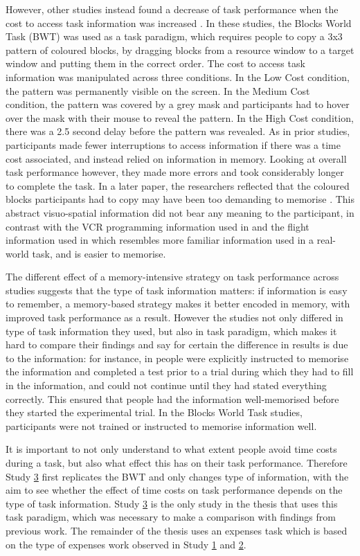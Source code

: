 However, other studies instead found a decrease of task performance when the cost to access task information was increased \citep{Gray2006, Morgan2009}. In these studies, the Blocks World Task (BWT) was used as a task paradigm, which requires people to copy a 3x3 pattern of coloured blocks, by dragging blocks from a resource window to a target window and putting them in the correct order. The cost to access task information was manipulated across three conditions. In the Low Cost condition, the pattern was permanently visible on the screen. In the Medium Cost condition, the pattern was covered by a grey mask and participants had to hover over the mask with their mouse to reveal the pattern. In the High Cost condition, there was a 2.5 second delay before the pattern was revealed. As in prior studies, participants made fewer interruptions to access information if there was a time cost associated, and instead relied on information in memory. Looking at overall task performance however, they made more errors and took considerably longer to complete the task. In a later paper, the researchers reflected that the coloured blocks participants had to copy may have been too demanding to memorise \citep{Waldron2011}. This abstract visuo-spatial information did not bear any meaning to the participant, in contrast with the VCR programming information used in \citet{Gray2004} and the flight information used in \citet{Waldron2007} which resembles more familiar information used in a real-world task, and is easier to memorise.

The different effect of a memory-intensive strategy on task performance across studies suggests that the type of task information matters: if information is easy to remember, a memory-based strategy makes it better encoded in memory, with improved task performance as a result. However the studies not only differed in type of task information they used, but also in task paradigm, which makes it hard to compare their findings and say for certain the difference in results is due to the information: for instance, in \citet{Gray2004} people were explicitly instructed to memorise the information and completed a test prior to a trial during which they had to fill in the information, and could not continue until they had stated everything correctly. This ensured that people had the information well-memorised before they started the experimental trial. In the Blocks World Task studies, participants were not trained or instructed to memorise information well.

It is important to not only understand to what extent people avoid time costs during a task, but also what effect this has on their task performance. Therefore Study \hyperref[st:Study3]{3} first replicates the BWT and only changes type of information, with the aim to see whether the effect of time costs on task performance depends on the type of task information. Study \hyperref[st:Study3]{3} is the only study in the thesis that uses this task paradigm, which was necessary to make a comparison with findings from previous work. The remainder of the thesis uses an expenses task which is based on the type of expenses work observed in Study \hyperref[st:Study1]{1} and \hyperref[st:Study2]{2}. 

